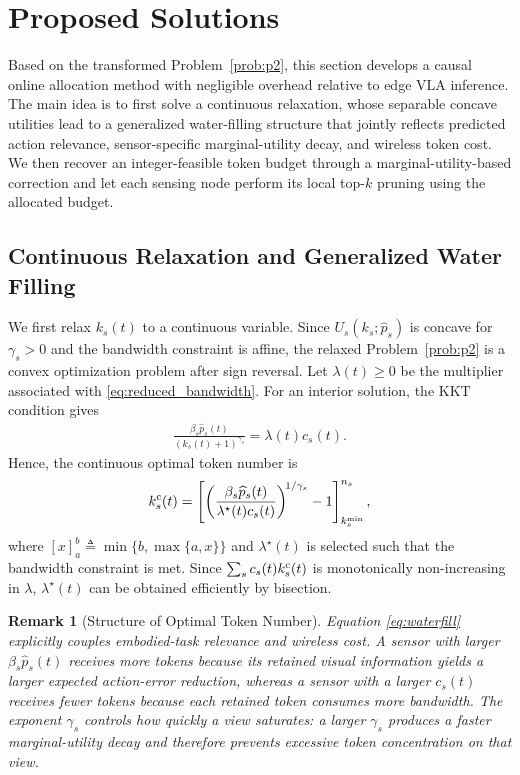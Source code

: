 \documentclass[lettersize,journal]{IEEEtran}
\theoremstyle{custom}
\newtheorem{Rem}{Remark}
\begin{document}
\section{Proposed Solutions}
Based on the transformed Problem~\ref{prob:p2}, this section develops a causal online allocation method with negligible overhead relative to edge VLA inference. The main idea is to first solve a continuous relaxation, whose separable concave utilities lead to a generalized water-filling structure that jointly reflects predicted action relevance, sensor-specific marginal-utility decay, and wireless token cost. We then recover an integer-feasible token budget through a marginal-utility-based correction and let each sensing node perform its local top-$k$ pruning using the allocated budget.
\subsection{Continuous Relaxation and Generalized Water Filling}
We first relax $k_s(t)$ to a continuous variable. Since $U_s(k_s;\widehat p_s)$ is concave for $\gamma_s>0$ and the bandwidth constraint is affine, the relaxed Problem~\ref{prob:p2} is a convex optimization problem after sign reversal. Let $\lambda(t)\geq0$ be the multiplier associated with \eqref{eq:reduced_bandwidth}. For an interior solution, the KKT condition gives
\begin{align}
    \frac{\beta_s\widehat p_s(t)}{(k_s(t)+1)^{\gamma_s}}
    =\lambda(t)c_s(t).
\end{align}
Hence, the continuous optimal token number is
\begin{align}\label{eq:waterfill}
    k_s^{\rm c}(t)
    =\left[
    \left(
    \frac{\beta_s\widehat p_s(t)}{\lambda^\star(t)c_s(t)}
    \right)^{\!1/\gamma_s}-1
    \right]_{k_s^{\min}}^{n_s},
\end{align}
where $[x]_a^b\triangleq\min\{b,\max\{a,x\}\}$ and $\lambda^\star(t)$ is selected such that the bandwidth constraint is met. Since $\sum_s c_s(t)k_s^{\rm c}(t)$ is monotonically non-increasing in $\lambda$, $\lambda^\star(t)$ can be obtained efficiently by bisection.
\begin{Rem}[Structure of Optimal Token Number]
    Equation \eqref{eq:waterfill} explicitly couples embodied-task relevance and wireless cost. A sensor with larger $\beta_s\widehat p_s(t)$ receives more tokens because its retained visual information yields a larger expected action-error reduction, whereas a sensor with a larger $c_s(t)$ receives fewer tokens because each retained token consumes more bandwidth. The exponent $\gamma_s$ controls how quickly a view saturates: a larger $\gamma_s$ produces a faster marginal-utility decay and therefore prevents excessive token concentration on that view.
\end{Rem}
\end{document}
